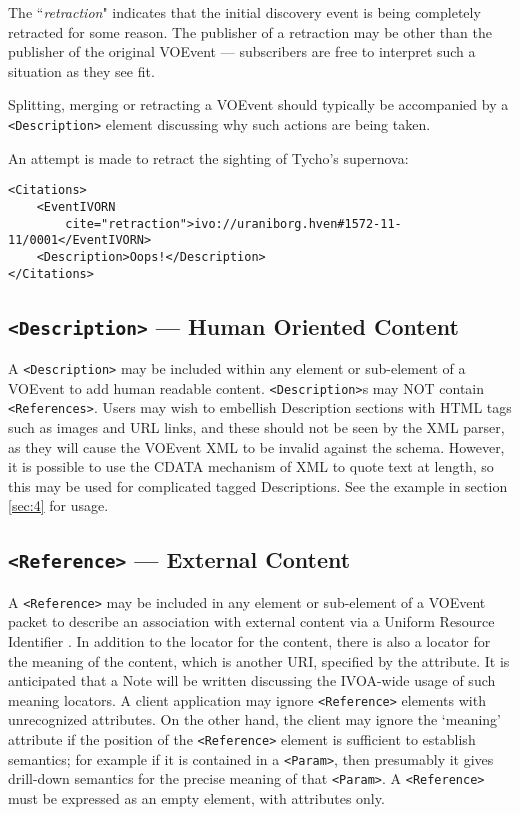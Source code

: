 \documentclass[11pt,a4paper]{ivoa}
\begin{document}
The ``\emph{retraction}"  indicates that the initial discovery event
is being completely retracted for some reason. The publisher of a retraction may
be other than the publisher of the original VOEvent --- subscribers are free to
interpret such a situation as they see fit.

Splitting, merging or retracting a VOEvent should typically be accompanied by a
\verb|<Description>| element discussing why such actions are being taken.

An attempt is made to retract the sighting of Tycho's supernova:
\begin{lstlisting}
<Citations>
    <EventIVORN 
        cite="retraction">ivo://uraniborg.hven#1572-11-11/0001</EventIVORN>
    <Description>Oops!</Description>
</Citations>
\end{lstlisting}

\subsection{\texttt{<Description>} --- Human Oriented Content}
\label{sec:3.8}
A \verb|<Description>| may be included within any element or sub-element of a
VOEvent to add human readable content. \verb|<Description>|s may NOT
contain
\verb|<References>|. Users may wish to embellish Description sections with HTML tags
such as images and URL links, and these should not be seen by the XML parser, as
they will cause the VOEvent XML to be invalid against the schema. However, it is
possible to use the CDATA mechanism of XML to quote text at length, so this may
be used for complicated tagged Descriptions. See the example in section
\ref{sec:4} for usage.

\subsection{\texttt{<Reference>} --- External Content}
\label{sec:3.9}

A \verb|<Reference>| may be included in any element or sub-element of a VOEvent
packet to describe an association with external content via a Uniform Resource
Identifier \citep{std:RFC3986}. In addition to the locator for the
content, there is also a locator for the meaning of the content, which is
another URI, specified by the  attribute. It is anticipated that a
Note will be written discussing the IVOA-wide usage of such meaning locators. A
client application may ignore \verb|<Reference>| elements with
unrecognized  attributes. On the other hand, the client may ignore the `meaning'
attribute if the position of the \verb|<Reference>| element is sufficient to
establish semantics; for example if it is contained in a \verb|<Param>|, then
presumably it gives drill-down semantics for the precise meaning of that
\verb|<Param>|. A \verb|<Reference>| must be expressed as an empty element, with
attributes only.
\end{document}
